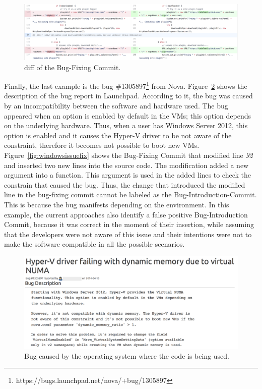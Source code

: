 \documentclass[a4paper, 12pt]{book}
\begin{document}
\begin{figure}[ht]
\centering
\includegraphics[width=\columnwidth]{img/githubfix.png}
\caption{diff of the Bug-Fixing Commit.}
\label{fig:javafix}       %
\end{figure}

Finally, the last example is the bug \#1305897\footnote{https://bugs.launchpad.net/nova/+bug/1305897} from Nova. Figure~\ref{fig:windowsissue} shows the description of the bug report in Launchpad. According to it, the bug was caused by an incompatibility between the software and hardware used. The bug appeared when an option is enabled by default in the VMs;  this option depends on the underlying hardware. Thus, when a user has Windows Server 2012, this option is enabled and it causes the Hyper-V driver to be not aware of the constraint, therefore it becomes not possible to boot new VMs. Figure~\ref{fig:windowsissuefix} shows the Bug-Fixing Commit that modified line \emph{92} and inserted two new lines into the source code. The modification added a new argument into a function. This argument is used in the added lines to check the constrain that caused the bug. Thus, the change that introduced the modified line in the bug-fixing commit cannot be labeled as the Bug-Introduction-Commit. This is because the bug manifests depending on the environment. In this example, the current approaches also identify a false positive Bug-Introduction Commit, because it was correct in the moment of their insertion, while assuming that the developers were not aware of this issue and their intentions were not to make the software compatible in all the possible scenarios.
\begin{figure}[ht]
\centering
\includegraphics[width=\columnwidth]{img/windowsIssue.png}
\caption{Bug caused by the operating system where the code is being used.}
\label{fig:windowsissue}       %
\end{figure}
\end{document}
